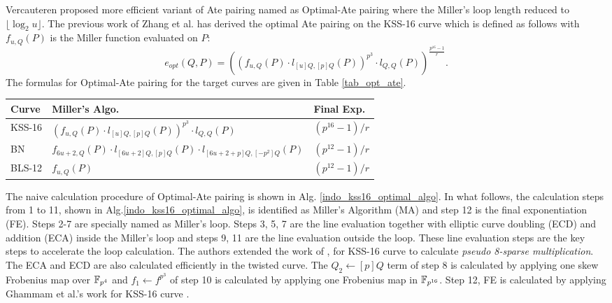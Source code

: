 Vercauteren proposed more efficient variant of Ate pairing named as Optimal-Ate pairing \cite{DBLP:journals/tit/Vercauteren10} where the Miller's loop length reduced to $\lfloor \log_2 u \rfloor$.
The previous work of Zhang et al. \cite{INDOCRYPT:ZhaLin12} has derived the optimal Ate pairing on the KSS-16 curve which is defined as follows with $f_{u,Q}(P)$ is the Miller function evaluated on $P$:
\begin{equation}
	e_{opt}(Q,P)=((f_{u,Q}(P)\cdot l_{[u]Q,[p]Q}(P))^{p^3}\cdot l_{Q,Q}(P))^{\frac{p^{16}-1}{r}}.
\end{equation}
The formulas for Optimal-Ate pairing for the target curves are given in Table \ref{tab_opt_ate}. 
\renewcommand{\baselinestretch}{1.5}
\begin{table*}[ht]
\centering
\caption{Optimal-Ate pairing formulas for target curves.}
\label{tab_opt_ate}
\begin{tabular}{|l|l|l|}
\hline
Curve  & Miller's Algo.                                                             & Final Exp.             \\ \hline
KSS-16 & $(f_{u,Q}(P)\cdot l_{[u]Q,[p]Q}(P))^{p^3}\cdot l_{Q,Q}(P)$                        & $(p^{16}-1)/r$ \\ \hline
BN     & $f_{6u+2,Q}(P )\cdot l_{[6u+2]Q,[p]Q} (P ) \cdot l_{[6u+2+p]Q,[-p^2]Q} (P)$ & $(p^{12}-1)/r$         \\ \hline
BLS-12 & $f_{u,Q}(P )$                                                              & $(p^{12}-1)/r$       \\ \hline
\end{tabular}
\end{table*}
\renewcommand{\baselinestretch}{1.0}

The naive calculation procedure of Optimal-Ate pairing is shown in Alg. \ref{indo_kss16_optimal_algo}.
In what follows, the calculation steps from 1 to 11, shown in Alg.\ref{indo_kss16_optimal_algo}, is identified as Miller's Algorithm (MA) and step 12 is the final exponentiation (FE).
Steps 2-7 are specially named as Miller's loop.
Steps 3, 5, 7 are the line evaluation together with elliptic curve doubling (ECD) and addition (ECA) inside the Miller's loop and steps 9, 11 are the line evaluation outside the loop.
These line evaluation steps are the key steps to accelerate the loop calculation. 
The authors extended the work of \cite{PAIRING:MANS13},\cite{ICISC:KONSD16} for KSS-16 curve to calculate \textit{pseudo 8-sparse multiplication}.
 The ECA and ECD are also calculated efficiently in the twisted curve. 
The $Q_2 \leftarrow [p]Q$ term of step 8 is calculated by applying one skew Frobenius map over $\mathbb{F}_{p^4}$ and $f_1\leftarrow f^{p^3}$ of step 10 is calculated by applying one Frobenius map in $\mathbb{F}_{p^{16}}$. 
Step 12, FE is calculated by applying Ghammam et al.'s work for KSS-16 curve \cite{EPRINT:GhaFou16b}.


